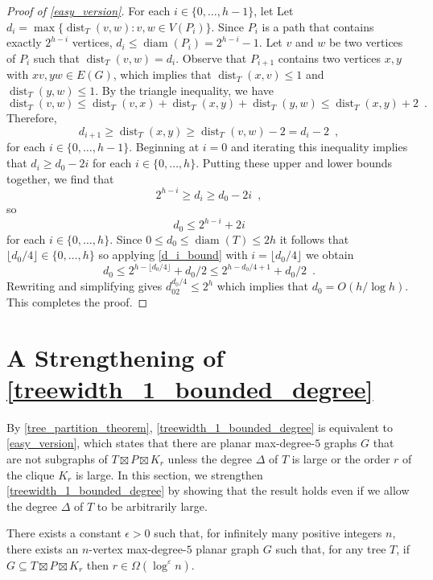 \documentclass{patmorin}
\DeclareMathOperator{\dist}{dist}
\DeclareMathOperator{\diam}{diam}
\begin{document}
\begin{proof}[Proof of \cref{easy_version}]
  For each $i\in\{0,\ldots,h-1\}$, let
  Let $d_i=\max\{\dist_T(v,w):v,w\in V(P_i)\}$.  Since $P_i$ is a path that contains exactly $2^{h-i}$ vertices, $d_i \le \diam(P_i) = 2^{h-i}-1$. Let $v$ and $w$ be two vertices of $P_i$ such that $\dist_T(v,w)=d_i$.  Observe that $P_{i+1}$ contains two vertices $x,y$ with $xv, yw\in E(G)$, which implies that $\dist_T(x,v)\le 1$ and $\dist_T(y,w)\le 1$.  By the triangle inequality, we have
  \[
    \dist_T(v,w) \le \dist_T(v,x)+\dist_T(x,y)+\dist_T(y,w) \le \dist_T(x,y)+2 \enspace .
  \]
  Therefore,
  \[
     d_{i+1} \ge \dist_T(x,y) \ge \dist_T(v,w)-2= d_i-2 \enspace ,
  \]
  for each $i\in\{0,\ldots,h-1\}$.  Beginning at $i=0$ and iterating this inequality implies that $d_i \ge d_0-2i$ for each $i\in\{0,\ldots,h\}$.
  Putting these upper and lower bounds together, we find that
  \[
    2^{h-i} \ge d_i \ge d_0-2i \enspace ,
  \]
  so
  \begin{equation}
    d_0 \le 2^{h-i}+2i  \label{d_i_bound}
  \end{equation}
  for each $i\in\{0,\ldots,h\}$.  Since $0\le d_0\le\diam(T)\le 2h$ it follows that $\lfloor d_0/4\rfloor\in\{0,\ldots,h\}$ so applying \cref{d_i_bound} with $i=\lfloor d_0/4\rfloor$ we obtain
  \[
    d_0 \le 2^{h-\lfloor d_0/4\rfloor} + d_0/2 \le 2^{h-d_0/4+1} + d_0/2 \enspace .
  \]
  Rewriting and simplifying gives $d_02^{d_0/4}\le 2^h$ which implies that $d_0 = O(h/\log h)$.  This completes the proof.
\end{proof}

\section{A Strengthening of \cref{treewidth_1_bounded_degree}}

By \cref{tree_partition_theorem}, \cref{treewidth_1_bounded_degree} is equivalent to \cref{easy_version}, which states that there are planar max-degree-$5$ graphs $G$ that are not subgraphs of $T\boxtimes P\boxtimes K_r$ unless the degree $\Delta$ of $T$ is large or the order $r$ of the clique $K_r$ is large.  In this section, we strengthen \cref{treewidth_1_bounded_degree} by showing that the result holds even if we allow the degree $\Delta$ of $T$ to be arbitrarily large.

\begin{lem}\label{hard_version}
  There exists a constant $\epsilon >0$ such that, for infinitely many positive integers $n$, there exists an $n$-vertex max-degree-$5$ planar graph $G$ such that, for any tree $T$, if $G\subseteq T\boxtimes P\boxtimes K_r$ then $r\in\Omega(\log^\varepsilon n)$.
\end{lem}
\end{document}
